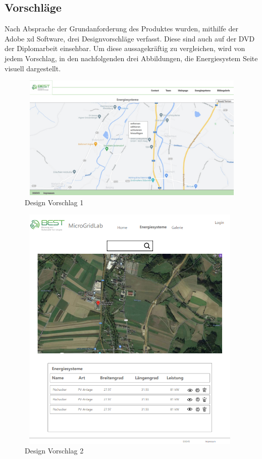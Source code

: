 \subsection{Vorschläge}
Nach Absprache der Grundanforderung des Produktes wurden, mithilfe der Adobe xd Software,  drei Designvorschläge verfasst. Diese sind auch auf der DVD der Diplomarbeit einsehbar. Um diese aussagekräftig zu vergleichen, wird von jedem Vorschlag, in den nachfolgenden drei Abbildungen, die Energiesystem Seite visuell dargestellt.
\begin{figure}[h]
	\centering
	\includegraphics[height=6cm,width=12cm]{images/DesignVorschlag1}
	\caption{Design Vorschlag 1}
	\label{fig:Design Vorschlag 1}
\end{figure}
\newpage
\begin{figure}[h]
	\centering
	\includegraphics[height=12cm,width=11cm]{images/DesignVorschlag2}
	\caption{Design Vorschlag 2}
	\label{fig:Design Vorschlag 2}
\end{figure}

